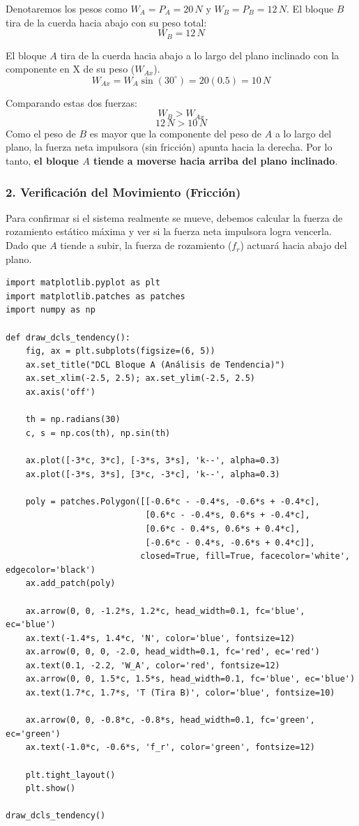\documentclass[12pt, a4paper]{article}
\begin{document}
Denotaremos los pesos como $W_A = P_A = 20\,\si{N}$ y $W_B = P_B = 12\,\si{N}$.
El bloque $B$ tira de la cuerda hacia abajo con su peso total:
$$ W_B = 12\,\si{N} $$

El bloque $A$ tira de la cuerda hacia abajo a lo largo del plano inclinado con la componente en X de su peso ($W_{Ax}$).
$$ W_{Ax} = W_A \sin(30^\circ) = 20(0.5) = 10\,\si{N} $$

Comparando estas dos fuerzas:
$$ W_B > W_{Ax} $$
$$ 12\,\si{N} > 10\,\si{N} $$
Como el peso de $B$ es mayor que la componente del peso de $A$ a lo largo del plano, la fuerza neta impulsora (sin fricción) apunta hacia la derecha. Por lo tanto, \textbf{el bloque $A$ tiende a moverse hacia arriba del plano inclinado}.

\subsubsection*{2. Verificación del Movimiento (Fricción)}
Para confirmar si el sistema realmente se mueve, debemos calcular la fuerza de rozamiento estático máxima y ver si la fuerza neta impulsora logra vencerla.
Dado que $A$ tiende a subir, la fuerza de rozamiento ($f_r$) actuará hacia abajo del plano.

\begin{lstlisting}
import matplotlib.pyplot as plt
import matplotlib.patches as patches
import numpy as np

def draw_dcls_tendency():
    fig, ax = plt.subplots(figsize=(6, 5))
    ax.set_title("DCL Bloque A (Análisis de Tendencia)")
    ax.set_xlim(-2.5, 2.5); ax.set_ylim(-2.5, 2.5)
    ax.axis('off')
    
    th = np.radians(30)
    c, s = np.cos(th), np.sin(th)
    
    ax.plot([-3*c, 3*c], [-3*s, 3*s], 'k--', alpha=0.3)
    ax.plot([-3*s, 3*s], [3*c, -3*c], 'k--', alpha=0.3)
    
    poly = patches.Polygon([[-0.6*c - -0.4*s, -0.6*s + -0.4*c], 
                            [0.6*c - -0.4*s, 0.6*s + -0.4*c], 
                            [0.6*c - 0.4*s, 0.6*s + 0.4*c], 
                            [-0.6*c - 0.4*s, -0.6*s + 0.4*c]], 
                           closed=True, fill=True, facecolor='white', edgecolor='black')
    ax.add_patch(poly)
    
    ax.arrow(0, 0, -1.2*s, 1.2*c, head_width=0.1, fc='blue', ec='blue')
    ax.text(-1.4*s, 1.4*c, 'N', color='blue', fontsize=12)
    ax.arrow(0, 0, 0, -2.0, head_width=0.1, fc='red', ec='red')
    ax.text(0.1, -2.2, 'W_A', color='red', fontsize=12)
    ax.arrow(0, 0, 1.5*c, 1.5*s, head_width=0.1, fc='blue', ec='blue')
    ax.text(1.7*c, 1.7*s, 'T (Tira B)', color='blue', fontsize=10)
    
    ax.arrow(0, 0, -0.8*c, -0.8*s, head_width=0.1, fc='green', ec='green')
    ax.text(-1.0*c, -0.6*s, 'f_r', color='green', fontsize=12)

    plt.tight_layout()
    plt.show()

draw_dcls_tendency()
\end{lstlisting}
\end{document}
